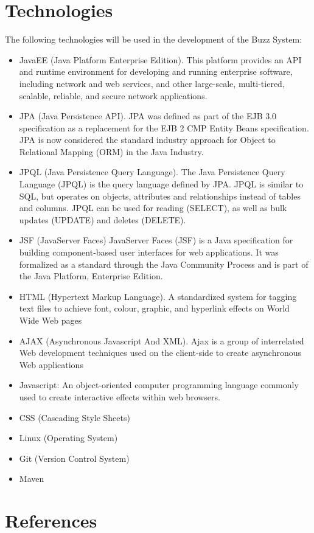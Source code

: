 \documentclass[a4paper]{article}
\begin{document}
\section{Technologies}
The following technologies will be used in the development of the Buzz System:
\begin{itemize}
\item JavaEE (Java Platform Enterprise Edition). This platform provides an API and runtime environment for developing and running enterprise software, including network and web services, and other large-scale, multi-tiered, scalable, reliable, and secure network applications.
\item JPA (Java Persistence API). JPA was defined as part of the EJB 3.0 specification as a replacement for the EJB 2 CMP Entity Beans specification. JPA is now considered the standard industry approach for Object to Relational Mapping (ORM) in the Java Industry. 
\item JPQL (Java Persistence Query Language). The Java Persistence Query Language (JPQL) is the query language defined by JPA. JPQL is similar to SQL, but operates on objects, attributes and relationships instead of tables and columns. JPQL can be used for reading (SELECT), as well as bulk updates (UPDATE) and deletes (DELETE).
\item JSF (JavaServer Faces) JavaServer Faces (JSF) is a Java specification for building component-based user interfaces for web applications. It was formalized as a standard through the Java Community Process and is part of the Java Platform, Enterprise Edition.
\item HTML (Hypertext Markup Language). A standardized system for tagging text files to achieve font, colour, graphic, and hyperlink effects on World Wide Web pages
\item AJAX (Asynchronous Javascript And XML). Ajax is a group of interrelated Web development techniques used on the client-side to create asynchronous Web applications
\item Javascript: An object-oriented computer programming language commonly used to create interactive effects within web browsers.
\item CSS (Cascading Style Sheets)
\item Linux (Operating System)
\item Git (Version Control System)
\item Maven
\end{itemize}


\section{References}
\end{document}
